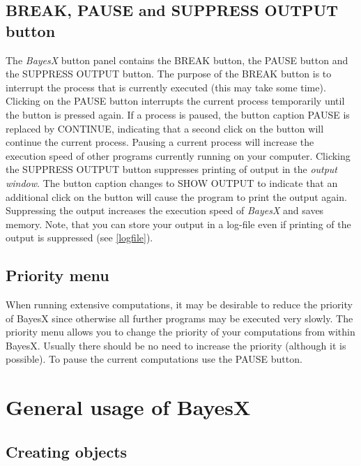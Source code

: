 \subsection{BREAK, PAUSE and SUPPRESS OUTPUT button}
\label{buttons}  
  
 

The {\em BayesX} button panel contains the BREAK button, the PAUSE
button and the SUPPRESS OUTPUT button. The purpose of the BREAK
button is to interrupt the process that is currently executed
(this may take some time). Clicking on the PAUSE button interrupts
the current process temporarily until the button is pressed again.
If a process is paused, the button caption PAUSE is replaced by
CONTINUE, indicating that a second click on the button will
continue the current process. Pausing a current process will
increase the execution speed of other programs currently running
on your computer. Clicking the SUPPRESS OUTPUT button suppresses
printing of output in the {\em output window}. The button caption
changes to SHOW OUTPUT to indicate that an additional click on the
button will cause the program to print the output again.
Suppressing the output increases the execution speed of {\em
BayesX} and saves memory. Note, that you can store your output in
a log-file even if printing of the output is suppressed (see
\autoref{logfile}).

\subsection{Priority menu}
\label{prioritymenu} 

When running extensive computations, it may be desirable to reduce
the priority of BayesX since otherwise all further programs may be
executed very slowly. The priority menu allows you to change the
priority of your computations from within BayesX. Usually there
should be no need to increase the priority (although it is
possible). To pause the current computations use the PAUSE button.

\section{General usage of BayesX}
\label{generalusage}

\subsection{Creating objects}
\label{createobject}  

